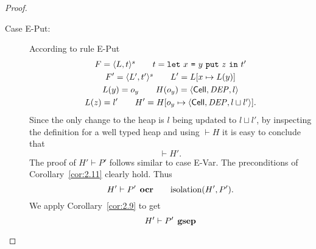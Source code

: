 \begin{proof}
\begin{description}
\begin{description}
\begin{description}
            \item[Case {\sc E-Put}:] According to rule {\sc E-Put}
              \begin{equation}
                \begin{gathered}
                  F = \mbox{$\langle L, t \rangle^s$} \quad\quad t = \mbox{\mdseries\texttt{let}~$x$~\texttt{=}~$\mbox{\mdseries$y$~\texttt{put}~$z$}$~\texttt{in}~$t'$} \\
                  F' = \mbox{$\langle L', t' \rangle^s$} \quad\quad L' = L[x \mapsto L(y)] \\
                  L(y) = o_y \quad\quad H(o_y) = \mbox{$\langle \mbox{$\mathsf{Cell}$}{}, \mathit{DEP}, l \rangle$} \\
                  L(z) = l' \quad\quad H' = H[o_y \mapsto \mbox{$\langle \mbox{$\mathsf{Cell}$}{}, \mathit{DEP}, l \sqcup
                  l' \rangle$}].
                \end{gathered}
              \end{equation}
              Since the only change to the heap is $l$ being updated to $l
              \sqcup l'$, by inspecting the definition for a well typed heap and
              using $\vdash H$ it is easy to conclude that
              \begin{equation}
                \vdash H'.
              \end{equation}
              The proof of $H' \vdash P'$ follows similar to case {\sc E-Var}.
              The preconditions of Corollary~\ref{cor:2.11} clearly hold. Thus 
              \begin{equation}
                H' \vdash P' \:\: \mbox{\bf ocr} \quad\quad \mbox{$\mathrm{isolation}$}(H', P').
              \end{equation}
              We apply Corollary~\ref{cor:2.9} to get
              \begin{equation}
                H' \vdash P' \:\: \mbox{\bf gsep}
              \end{equation}


\end{description}
\end{description}
\end{description}
\end{proof}
